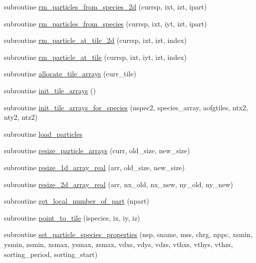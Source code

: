 \begin{DoxyCompactItemize}
\item 
subroutine \hyperlink{namespacetiling_a837e4ff4ce81c945e94ea975a1df6fc1}{rm\+\_\+particles\+\_\+from\+\_\+species\+\_\+2d} (currsp, ixt, izt, ipart)
\item 
subroutine \hyperlink{namespacetiling_a473875b1f5e9bc6b47ff5d088db15e58}{rm\+\_\+particles\+\_\+from\+\_\+species} (currsp, ixt, iyt, izt, ipart)
\item 
subroutine \hyperlink{namespacetiling_ad6083dac6e2eaccb762ecb829c954898}{rm\+\_\+particle\+\_\+at\+\_\+tile\+\_\+2d} (currsp, ixt, izt, index)
\item 
subroutine \hyperlink{namespacetiling_a7657907098a724d053d587ca73725958}{rm\+\_\+particle\+\_\+at\+\_\+tile} (currsp, ixt, iyt, izt, index)
\item 
subroutine \hyperlink{namespacetiling_aacbab18e61ac532ba396b41bab67a265}{allocate\+\_\+tile\+\_\+arrays} (curr\+\_\+tile)
\item 
subroutine \hyperlink{namespacetiling_a97b828159c1e05df8082c27f3aa61e13}{init\+\_\+tile\+\_\+arrays} ()
\item 
subroutine \hyperlink{namespacetiling_afe5a0a0a27fa1c078f8e69228d0d4a56}{init\+\_\+tile\+\_\+arrays\+\_\+for\+\_\+species} (nspec2, species\+\_\+array, aofgtiles, ntx2, nty2, ntz2)
\item 
subroutine \hyperlink{namespacetiling_ae5c4e98ae7e7957054dda03ab0e298f8}{load\+\_\+particles}
\item 
subroutine \hyperlink{namespacetiling_aaa407b13d58fff3e54b191fa9a8962c0}{resize\+\_\+particle\+\_\+arrays} (curr, old\+\_\+size, new\+\_\+size)
\item 
subroutine \hyperlink{namespacetiling_ad65e35a84d2268ef2b6b4f97f38b18bc}{resize\+\_\+1d\+\_\+array\+\_\+real} (arr, old\+\_\+size, new\+\_\+size)
\item 
subroutine \hyperlink{namespacetiling_afa3d754a121460dce786357819629421}{resize\+\_\+2d\+\_\+array\+\_\+real} (arr, nx\+\_\+old, nx\+\_\+new, ny\+\_\+old, ny\+\_\+new)
\item 
subroutine \hyperlink{namespacetiling_af9f6fdf5c755688f10dc74ed3c363d85}{get\+\_\+local\+\_\+number\+\_\+of\+\_\+part} (npart)
\item 
subroutine \hyperlink{namespacetiling_a875e1671637fb100355fe099ef2a4f63}{point\+\_\+to\+\_\+tile} (ispecies, ix, iy, iz)
\item 
subroutine \hyperlink{namespacetiling_a832a380c64af7fb0611b3528b1b28ef2}{set\+\_\+particle\+\_\+species\+\_\+properties} (nsp, sname, mss, chrg, nppc, xsmin, ysmin, zsmin, xsmax, ysmax, zsmax, vdxs, vdys, vdzs, vthxs, vthys, vthzs, sorting\+\_\+period, sorting\+\_\+start)

\end{DoxyCompactItemize}
